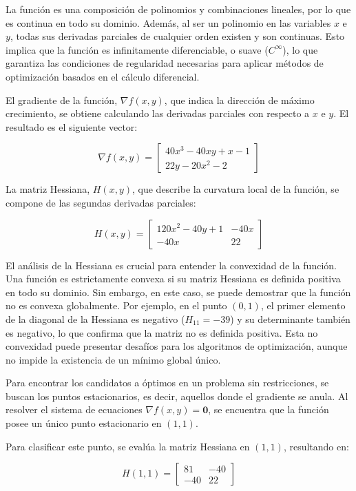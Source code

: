 \documentclass{article}
\begin{document}
La función es una composición de polinomios y combinaciones lineales, por lo que es continua en todo su dominio. Además, al ser un polinomio en las variables $x$ e $y$, todas sus derivadas parciales de cualquier orden existen y son continuas. Esto implica que la función es infinitamente diferenciable, o suave ($C^\infty$), lo que garantiza las condiciones de regularidad necesarias para aplicar métodos de optimización basados en el cálculo diferencial.


El gradiente de la función, $\nabla f(x,y)$, que indica la dirección de máximo crecimiento, se obtiene calculando las derivadas parciales con respecto a $x$ e $y$. El resultado es el siguiente vector:

\[
\nabla f(x,y) = \begin{bmatrix} 40x^3 - 40xy + x - 1 \\ 22y - 20x^2 - 2 \end{bmatrix}
\]

La matriz Hessiana, $H(x,y)$, que describe la curvatura local de la función, se compone de las segundas derivadas parciales:

\[
H(x,y) = \begin{bmatrix} 120x^2 - 40y + 1 & -40x \\ -40x & 22 \end{bmatrix}
\]

El análisis de la Hessiana es crucial para entender la convexidad de la función. Una función es estrictamente convexa si su matriz Hessiana es definida positiva en todo su dominio. Sin embargo, en este caso, se puede demostrar que la función no es convexa globalmente. Por ejemplo, en el punto $(0, 1)$, el primer elemento de la diagonal de la Hessiana es negativo ($H_{11} = -39$) y su determinante también es negativo, lo que confirma que la matriz no es definida positiva. Esta no convexidad puede presentar desafíos para los algoritmos de optimización, aunque no impide la existencia de un mínimo global único.


Para encontrar los candidatos a óptimos en un problema sin restricciones, se buscan los puntos estacionarios, es decir, aquellos donde el gradiente se anula. Al resolver el sistema de ecuaciones $\nabla f(x,y) = \mathbf{0}$, se encuentra que la función posee un único punto estacionario en $(1, 1)$.

Para clasificar este punto, se evalúa la matriz Hessiana en $(1, 1)$, resultando en:

\[
H(1,1) = \begin{bmatrix} 81 & -40 \\ -40 & 22 \end{bmatrix}
\]
\end{document}
